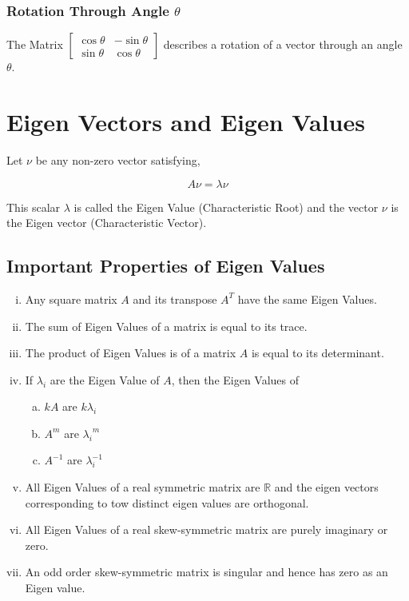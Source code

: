 \documentclass{article}
\begin{document}
\subsubsection{Rotation Through Angle $\theta$}
The Matrix $\begin{bmatrix}
        \cos \theta & -\sin \theta \\
        \sin \theta & \cos \theta
    \end{bmatrix}$ describes a rotation of a vector through an angle $\theta$.

\section{Eigen Vectors and Eigen Values}
Let $\nu$ be any non-zero vector satisfying,

$$A\nu=\lambda \nu$$

This scalar $\lambda$ is called the Eigen Value (Characteristic Root) and the vector $\nu$ is the Eigen vector (Characteristic Vector).
\subsection{Important Properties of Eigen Values}
\begin{enumerate}[i.]
    \item Any square matrix $A$ and its transpose $A^T$ have the same Eigen Values.
    \item The sum of Eigen Values of a matrix is equal to its trace.
    \item The product of Eigen Values is of a matrix $A$ is equal to its determinant.
    \item If $\lambda_{i}$ are the Eigen Value of $A$, then the Eigen Values of
          \begin{enumerate}[a.]
             \item $kA$ are $k\lambda_{i}$
             \item $A^m$ are ${\lambda_{i}}^m$
             \item $A^{-1}$ are $\lambda_{i}^{-1}$
          \end{enumerate}
    \item All Eigen Values of a real symmetric matrix are $\mathbb{R}$ and the eigen vectors corresponding to tow distinct eigen values are orthogonal.
    \item All Eigen Values of a real skew-symmetric matrix are purely imaginary or zero. 
    \item An odd order skew-symmetric matrix is singular and hence has zero as an Eigen value.
\end{enumerate}
\end{document}
